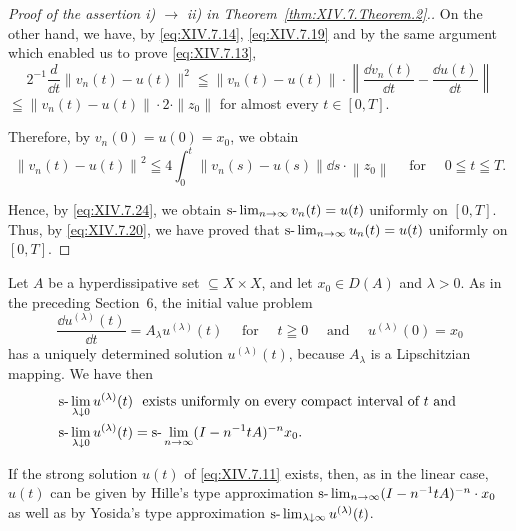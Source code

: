 \begin{proof}[Proof of the assertion i) $\to$ ii) in Theorem~\ref{thm:XIV.7.Theorem.2}.]
On the other hand, we have, by \eqref{eq:XIV.7.14}, \eqref{eq:XIV.7.19} and by the same argument which enabled us to prove \eqref{eq:XIV.7.13}, 
\[
2 ^{-1} \frac {d}{\dd t} \| v _{n} (t) - u (t) \| ^{2} \leqq \| v _{n} (t) - u (t) \| \cdot \left\| \frac {\dd v _{n} (t)}{\dd t} - \frac {\dd u (t)}{\dd t} \right\|
\]
$\leqq \|v_n(t) - u(t)\| \cdot 2 \cdot \|z_0\|$ for almost every $t \in [0, T]$. 

Therefore, by $v_{n}(0) = u(0) = x_{0}$, we obtain 
\[
\left\| v _{n} (t) - u (t) \right\| ^{2} \leqq 4 \int_{0} ^{t} \left\| v _{n} (s) - u (s) \right\| \dd s \cdot \left\| z _{0} \right\| \quad \text{ for } \quad 0 \leqq t \leqq T.
\]

Hence, by \eqref{eq:XIV.7.24}, we obtain $\text{s-}\lim\nolimits_{n\to \infty}v_n(t) = u(t)$ uniformly on $[0,T]$. Thus, by \eqref{eq:XIV.7.20}, we have proved that $\text{s-}\lim\nolimits_{n\to \infty}u_n(t) = u(t)$ uniformly on $[0,T]$. 
\end{proof}

\begin{theorem}\label{thm:XIV.7.Theorem.3} Let $A$ be a hyperdissipative set $\subseteq X \times X$, and let $x_0 \in D(A)$ and $\lambda > 0$. As in the preceding Section~\hyperref[sec:XIV.6]{$6$}, the initial value problem 
\begin{equation}\label{eq:XIV.7.25}
\frac {\dd u ^{(\lambda)} (t)}{\dd t} = A _{\lambda} u ^{(\lambda)} (t) \quad \text{ for } \quad t \geqq 0 \quad \text{ and } \quad u ^{(\lambda)} (0) = x _{0}
\end{equation}
has a uniquely determined solution $u^{(\lambda)}(t)$, because $A_{\lambda}$ is a Lipschitzian mapping. We have then 
\begin{equation}\label{eq:XIV.7.26}
\begin{aligned}
\text{s-}\lim_{\lambda \downarrow 0} u^{(\lambda)}(t) &\ \text{ exists uniformly on every compact interval of } t \text{ and }
\\
\text{s-}\lim_{\lambda \downarrow 0} u^{(\lambda)}(t) &= \text{s-}\lim_{n \rightarrow \infty} (I - n^{-1} t A)^{-n} x _{0}.
\end{aligned}
\end{equation}
\end{theorem}

\begin{remarku} If the strong solution $u(t)$ of \eqref{eq:XIV.7.11} exists, then, as in the linear case, $u(t)$ can be given by Hille's type approximation $\text{s-}\lim\nolimits_{n\to \infty}(I - n^{-1}tA)^{-n}\cdot x_0$ as well as by Yosida's type approximation $\text{s-}\lim\nolimits_{\lambda \downarrow \infty}u^{(\lambda)}(t)$. 
\end{remarku}

